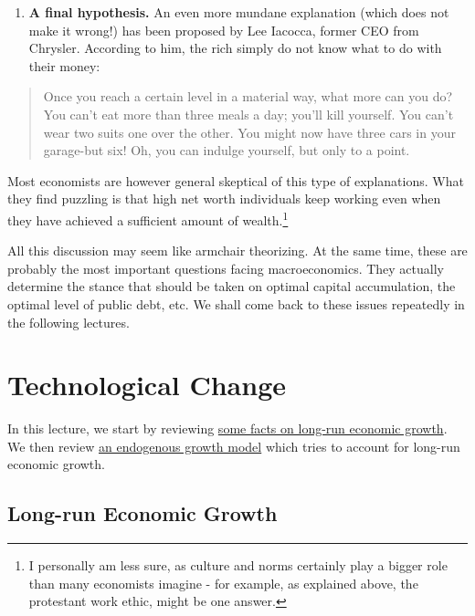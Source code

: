 \documentclass[]{book}
\providecommand{\tightlist}{%
  \setlength{\itemsep}{0pt}\setlength{\parskip}{0pt}}
\let\rmarkdownfootnote\footnote%
\def\footnote{\protect\rmarkdownfootnote}
\theoremstyle{definition}
\theoremstyle{definition}
\theoremstyle{definition}
\theoremstyle{remark}
\begin{document}
\begin{enumerate}
\def\labelenumi{\arabic{enumi}.}
\setcounter{enumi}{4}
\tightlist
\item
  \textbf{A final hypothesis.} An even more mundane explanation (which
  does not make it wrong!) has been proposed by Lee Iacocca, former CEO
  from Chrysler. According to him, the rich simply do not know what to
  do with their money:
\end{enumerate}

\begin{quote}
Once you reach a certain level in a material way, what more can you do?
You can't eat more than three meals a day; you'll kill yourself. You
can't wear two suits one over the other. You might now have three cars
in your garage-but six! Oh, you can indulge yourself, but only to a
point.
\end{quote}

Most economists are however general skeptical of this type of
explanations. What they find puzzling is that high net worth individuals
keep working even when they have achieved a sufficient amount of
wealth.\footnote{I personally am less sure, as culture and norms
  certainly play a bigger role than many economists imagine - for
  example, as explained above, the protestant work ethic, might be one
  answer.}

All this discussion may seem like armchair theorizing. At the same time,
these are probably the most important questions facing macroeconomics.
They actually determine the stance that should be taken on optimal
capital accumulation, the optimal level of public debt, etc. We shall
come back to these issues repeatedly in the following lectures.

\hypertarget{technology}{\chapter{Technological
Change}\label{technology}}

In this lecture, we start by reviewing
\protect\hyperlink{long-run-growth}{some facts on long-run economic
growth}. We then review \protect\hyperlink{endogenous-growth-model}{an
endogenous growth model} which tries to account for long-run economic
growth.

\hypertarget{long-run-growth}{\section{Long-run Economic
Growth}\label{long-run-growth}}
\end{document}
